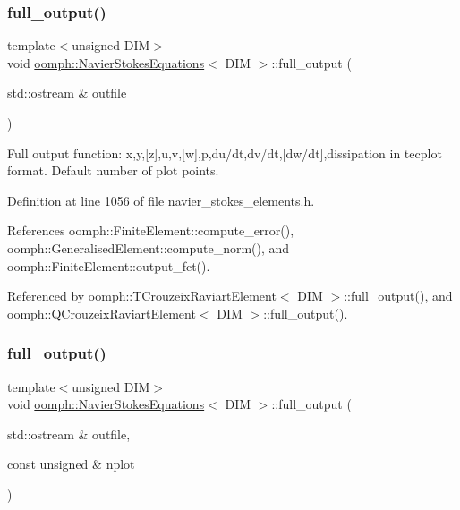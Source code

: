 \subsubsection{\texorpdfstring{full\+\_\+output()}{full\_output()}\hspace{0.1cm}{\footnotesize\ttfamily [1/2]}}
{\footnotesize\ttfamily template$<$unsigned D\+IM$>$ \\
void \hyperlink{classoomph_1_1NavierStokesEquations}{oomph\+::\+Navier\+Stokes\+Equations}$<$ D\+IM $>$\+::full\+\_\+output (\begin{DoxyParamCaption}\item[{std\+::ostream \&}]{outfile }\end{DoxyParamCaption})\hspace{0.3cm}{\ttfamily [inline]}}



Full output function\+: x,y,\mbox{[}z\mbox{]},u,v,\mbox{[}w\mbox{]},p,du/dt,dv/dt,\mbox{[}dw/dt\mbox{]},dissipation in tecplot format. Default number of plot points. 



Definition at line 1056 of file navier\+\_\+stokes\+\_\+elements.\+h.



References oomph\+::\+Finite\+Element\+::compute\+\_\+error(), oomph\+::\+Generalised\+Element\+::compute\+\_\+norm(), and oomph\+::\+Finite\+Element\+::output\+\_\+fct().



Referenced by oomph\+::\+T\+Crouzeix\+Raviart\+Element$<$ D\+I\+M $>$\+::full\+\_\+output(), and oomph\+::\+Q\+Crouzeix\+Raviart\+Element$<$ D\+I\+M $>$\+::full\+\_\+output().

\mbox{\label{classoomph_1_1NavierStokesEquations_a6ef3acb397f096ebf34826e05dcb225b}} 
\subsubsection{\texorpdfstring{full\+\_\+output()}{full\_output()}\hspace{0.1cm}{\footnotesize\ttfamily [2/2]}}
{\footnotesize\ttfamily template$<$unsigned D\+IM$>$ \\
void \hyperlink{classoomph_1_1NavierStokesEquations}{oomph\+::\+Navier\+Stokes\+Equations}$<$ D\+IM $>$\+::full\+\_\+output (\begin{DoxyParamCaption}\item[{std\+::ostream \&}]{outfile,  }\item[{const unsigned \&}]{nplot }\end{DoxyParamCaption})}



